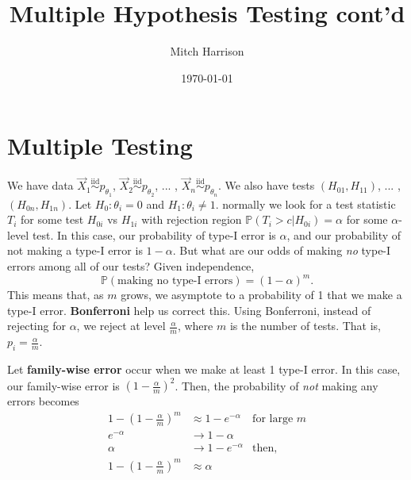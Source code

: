 \documentclass[titlepage, 12pt, leqno]{article}
\title{\Huge{Multiple Hypothesis Testing cont'd}}
\author{\large{Mitch Harrison}}
\date{\today}
\begin{document}
\setlength{\parskip}{1\baselineskip}
\setlength{\parindent}{15pt}
\maketitle
\tableofcontents
\newpage


\section{Multiple Testing}

We have data $\vec X_{1} \overset{\mathrm{iid}}{\sim} p_{\theta_{1}}$, 
$\vec X_{2} \overset{\mathrm{iid}}{\sim}p_{\theta_{2}}$, ... , 
$\vec X_{n} \overset{\mathrm{iid}}{\sim}p_{\theta_{n}}$. We also have tests
$(H_{01}, H_{11})$, ... , $(H_{0n}, H_{1n})$. Let $H_{0} : \theta_{i}=0$ and
$H_{1}:\theta_{i} \ne 1$. normally we look for a test statistic $T_{i}$ for
some test $H_{0i}$ vs $H_{1i}$ with rejection region $\mathbb{P}(T_{i}>c |
H_{0i}) = \alpha$ for some $\alpha$-level test. In this case, our probability
of type-I error is $\alpha$, and our probability of not making a type-I error
is $1-\alpha$. But what are our odds of making \textit{no} type-I errors among
all of our tests? Given independence, 
\[
\mathbb{P}( \text{making no type-I errors}) = (1-\alpha)^{m}.
\]
This means that, as $m$ grows, we asymptote to a probability of 1 that we make
a type-I error. \textbf{Bonferroni} help us correct this. Using Bonferroni,
instead of rejecting for $\alpha$, we reject at level $\frac{\alpha}{m}$, 
where $m$ is the number of tests. That is, $p_{i} = \frac{\alpha}{m}$.

Let \textbf{family-wise error} occur when we make at least 1 type-I error.
In this case, our family-wise error is $(1-\frac{\alpha}{m})^{2}$. Then, the
probability of \textit{not} making any errors becomes
\begin{align*}
    1 - \left(1 - \frac{\alpha}{m}\right)^{m}
    &\approx 1 - e^{-\alpha}
    & \text{for large $m$}\\
    e^{-\alpha} &\rightarrow 1 - \alpha \\
    \alpha &\rightarrow 1 - e^{-\alpha} 
    & \text{then,} \\
    1 - \left(1 - \frac{\alpha}{m}\right)^{m} &\approx \alpha
\end{align*}
\end{document}
